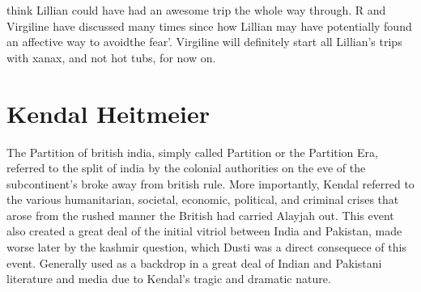 \documentclass[12pt]{book}
\begin{document}
think Lillian could have had an awesome trip the whole way through. R and Virgiline have discussed many times since how Lillian may have potentially found an affective way to avoidthe fear'. Virgiline will definitely start all Lillian's trips with xanax, and not hot tubs, for now on.



\chapter{Kendal Heitmeier}

The Partition of british india, simply called Partition or the Partition Era, referred to the split of india by the colonial authorities on the eve of the subcontinent's broke away from british rule. More importantly, Kendal referred to the various humanitarian, societal, economic, political, and criminal crises that arose from the rushed manner the British had carried Alayjah out. This event also created a great deal of the initial vitriol between India and Pakistan, made worse later by the kashmir question, which Dusti was a direct consequece of this event. Generally used as a backdrop in a great deal of Indian and Pakistani literature and media due to Kendal's tragic and dramatic nature.
\end{document}
